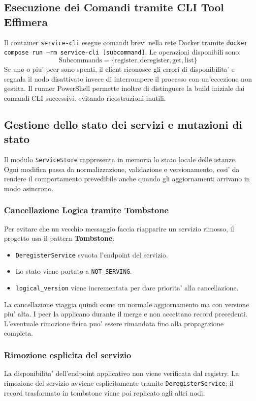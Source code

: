 \documentclass[conference]{IEEEtran}
\begin{document}
\subsection{Esecuzione dei Comandi tramite CLI Tool Effimera}
Il container \texttt{service-cli} esegue comandi brevi nella rete Docker tramite \texttt{docker compose run --rm service-cli [subcommand]}. Le operazioni disponibili sono:
\begin{equation}
\text{Subcommands} = \{\text{register}, \text{deregister}, \text{get}, \text{list}\}
\end{equation}
Se uno o piu' peer sono spenti, il client riconosce gli errori di disponibilita' e segnala il nodo disattivato invece di interrompere il processo con un'eccezione non gestita. Il runner PowerShell permette inoltre di distinguere la build iniziale dai comandi CLI successivi, evitando ricostruzioni inutili.

\subsection{Gestione dello stato dei servizi e mutazioni di stato}
Il modulo \texttt{ServiceStore} rappresenta in memoria lo stato locale delle istanze. Ogni modifica passa da normalizzazione, validazione e versionamento, cosi' da rendere il comportamento prevedibile anche quando gli aggiornamenti arrivano in modo asincrono.

\subsubsection{Cancellazione Logica tramite Tombstone}
Per evitare che un vecchio messaggio faccia riapparire un servizio rimosso, il progetto usa il pattern \textbf{Tombstone}:
\begin{itemize}
  \item \texttt{DeregisterService} svuota l'endpoint del servizio.
  \item Lo stato viene portato a \texttt{NOT\_SERVING}.
  \item \texttt{logical\_version} viene incrementata per dare priorita' alla cancellazione.
\end{itemize}
La cancellazione viaggia quindi come un normale aggiornamento ma con versione piu' alta. I peer la applicano durante il merge e non accettano record precedenti. L'eventuale rimozione fisica puo' essere rimandata fino alla propagazione completa.



\subsubsection{Rimozione esplicita del servizio}
La disponibilita' dell'endpoint applicativo non viene verificata dal registry. La rimozione del servizio avviene esplicitamente tramite \texttt{DeregisterService}; il record trasformato in tombstone viene poi replicato agli altri nodi.
\end{document}
